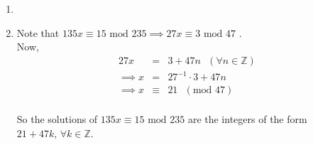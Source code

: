 \begin{enumerate}

\item

\item Note that $135x \equiv 15 \textrm{ mod } 235 \implies 27x \equiv 3
\textrm{ mod } 47$ \cite{slides_30}.\\

Now, \begin{eqnarray*}
	27x &=& 3 + 47n \textrm{ } (\forall n \in \mathbb{Z}) \\
	\implies x &=& 27^{-1} \cdot 3 + 47n \\
	\implies x &\equiv& 21 \textrm{ } (\textrm{mod } 47) \\
\end{eqnarray*}

So the solutions of $135x \equiv 15 \textrm{ mod } 235$ are the integers of the
form $21 + 47k \textrm{, } \forall k \in \mathbb{Z}$.

\end{enumerate}
